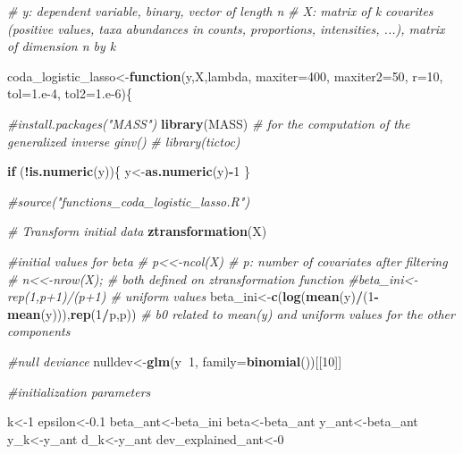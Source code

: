 \documentclass[]{book}
\newenvironment{Shaded}{\begin{snugshade}}{\end{snugshade}}
\newcommand{\KeywordTok}[1]{\textcolor[rgb]{0.13,0.29,0.53}{\textbf{#1}}}
\newcommand{\DataTypeTok}[1]{\textcolor[rgb]{0.13,0.29,0.53}{#1}}
\newcommand{\DecValTok}[1]{\textcolor[rgb]{0.00,0.00,0.81}{#1}}
\newcommand{\FloatTok}[1]{\textcolor[rgb]{0.00,0.00,0.81}{#1}}
\newcommand{\CommentTok}[1]{\textcolor[rgb]{0.56,0.35,0.01}{\textit{#1}}}
\newcommand{\ControlFlowTok}[1]{\textcolor[rgb]{0.13,0.29,0.53}{\textbf{#1}}}
\newcommand{\OperatorTok}[1]{\textcolor[rgb]{0.81,0.36,0.00}{\textbf{#1}}}
\newcommand{\NormalTok}[1]{#1}
\begin{document}
\begin{Shaded}
\begin{Highlighting}[]
\CommentTok{# y: dependent variable, binary, vector of length n}
\CommentTok{# X: matrix of k covarites (positive values, taxa abundances in counts, proportions, intensities, ...), matrix of dimension n by k}

\NormalTok{coda_logistic_lasso<-}\ControlFlowTok{function}\NormalTok{(y,X,lambda, }\DataTypeTok{maxiter=}\DecValTok{400}\NormalTok{, }\DataTypeTok{maxiter2=}\DecValTok{50}\NormalTok{, }\DataTypeTok{r=}\DecValTok{10}\NormalTok{, }
                              \DataTypeTok{tol=}\FloatTok{1.e-4}\NormalTok{, }\DataTypeTok{tol2=}\FloatTok{1.e-6}\NormalTok{)\{}

  \CommentTok{#install.packages("MASS")}
  \KeywordTok{library}\NormalTok{(MASS)   }\CommentTok{# for the computation of the generalized inverse ginv()}
\CommentTok{#  library(tictoc)}

  \ControlFlowTok{if}\NormalTok{ (}\OperatorTok{!}\KeywordTok{is.numeric}\NormalTok{(y))\{}
\NormalTok{    y<-}\KeywordTok{as.numeric}\NormalTok{(y)}\OperatorTok{-}\DecValTok{1}
\NormalTok{  \}}

  \CommentTok{#source("functions_coda_logistic_lasso.R") }

  \CommentTok{# Transform initial data }
  \KeywordTok{ztransformation}\NormalTok{(X)}

  \CommentTok{#initial values for beta}
  \CommentTok{#   p<<-ncol(X)   # p: number of covariates after filtering}
  \CommentTok{#   n<<-nrow(X);  # both defined on ztransformation function}
  \CommentTok{#beta_ini<-rep(1,p+1)/(p+1)  # uniform values }
\NormalTok{  beta_ini<-}\KeywordTok{c}\NormalTok{(}\KeywordTok{log}\NormalTok{(}\KeywordTok{mean}\NormalTok{(y)}\OperatorTok{/}\NormalTok{(}\DecValTok{1}\OperatorTok{-}\KeywordTok{mean}\NormalTok{(y))),}\KeywordTok{rep}\NormalTok{(}\DecValTok{1}\OperatorTok{/}\NormalTok{p,p))   }\CommentTok{# b0 related to mean(y) and uniform values for the other components}
  
 \CommentTok{#null deviance}
\NormalTok{  nulldev<-}\KeywordTok{glm}\NormalTok{(y}\OperatorTok{~}\DecValTok{1}\NormalTok{, }\DataTypeTok{family=}\KeywordTok{binomial}\NormalTok{())[[}\DecValTok{10}\NormalTok{]]}
  
  
  \CommentTok{#initialization parameters}
  
\NormalTok{  k<-}\DecValTok{1}
\NormalTok{  epsilon<-}\FloatTok{0.1}
\NormalTok{  beta_ant<-beta_ini}
\NormalTok{  beta<-beta_ant}
\NormalTok{  y_ant<-beta_ant}
\NormalTok{  y_k<-y_ant}
\NormalTok{  d_k<-y_ant}
\NormalTok{  dev_explained_ant<-}\DecValTok{0}
  

\end{Highlighting}
\end{Shaded}
\end{document}
